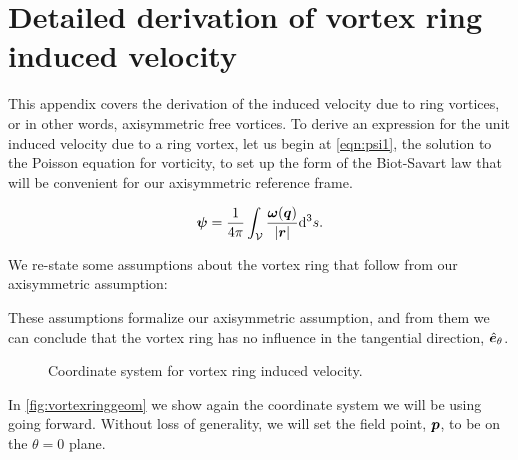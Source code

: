 \chapter{Detailed derivation of vortex ring induced velocity}
\label{app:ringvortexinducedvelocities}

This appendix covers the derivation of the induced velocity due to ring vortices, or in other words, axisymmetric free vortices.
%
To derive an expression for the unit induced velocity due to a ring vortex, let us begin at \cref{eqn:psi1}, the solution to the Poisson equation for vorticity, to set up the form of the Biot-Savart law that will be convenient for our axisymmetric reference frame.

\begin{equation}
    \label{eqn:psi1_app}
    \bm{\psi} = \frac{1}{4\pi} \int_{\mathcal{V}} \frac{\bm{\omega}(\bm{q})}{|\bm{r}|} \mathrm{d}^3s.
\end{equation}


We re-state some assumptions about the vortex ring that follow from our axisymmetric assumption:

\begin{assumption}{}
    \vspace*{-\baselineskip}
\end{assumption}

\begin{assumption}{}
    \vspace*{-\baselineskip}
\end{assumption}

\noindent These assumptions formalize our axisymmetric assumption, and from them we can conclude that the vortex ring has no influence in the tangential direction, \(\hat{\bm{e}}_\theta\).

\begin{figure}[h!]
    \centering
        
        \caption{Coordinate system for vortex ring induced velocity.}
    \label{fig:vortexringgeom_app}
\end{figure}

In \cref{fig:vortexringgeom} we show again the coordinate system we will be using going forward.
%
Without loss of generality, we will set the field point, \(\bm{p}\), to be on the \(\theta = 0\) plane.
%

